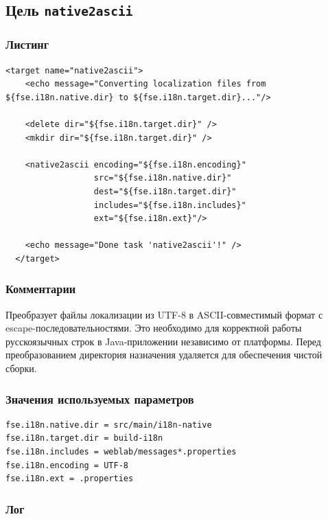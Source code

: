 \subsection{Цель \texttt{native2ascii}}

\subsubsection{Листинг}

\begin{lstlisting}[caption={Часть содержимого файла \texttt{build.xml}},captionpos=b]
  <target name="native2ascii">
    <echo message="Converting localization files from ${fse.i18n.native.dir} to ${fse.i18n.target.dir}..."/>

    <delete dir="${fse.i18n.target.dir}" />
    <mkdir dir="${fse.i18n.target.dir}" />

    <native2ascii encoding="${fse.i18n.encoding}"
                  src="${fse.i18n.native.dir}"
                  dest="${fse.i18n.target.dir}"
                  includes="${fse.i18n.includes}"
                  ext="${fse.i18n.ext}"/>

    <echo message="Done task 'native2ascii'!" />
  </target>
\end{lstlisting}

\subsubsection{Комментарии}

Преобразует файлы локализации из UTF-8 в ASCII-совместимый формат с escape-последовательностями. Это необходимо для корректной работы русскоязычных строк в Java-приложении независимо от платформы. Перед преобразованием директория назначения удаляется для обеспечения чистой сборки.

\subsubsection{Значения используемых параметров}

\begin{lstlisting}[language=Properties,caption={Часть содержимого файла \texttt{build.properties}},captionpos=b]
fse.i18n.native.dir = src/main/i18n-native
fse.i18n.target.dir = build-i18n
fse.i18n.includes = weblab/messages*.properties
fse.i18n.encoding = UTF-8
fse.i18n.ext = .properties
\end{lstlisting}

\subsubsection{Лог}

